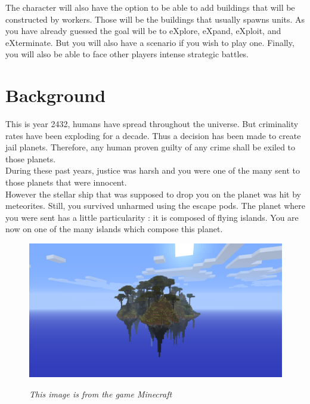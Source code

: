 \documentclass[article]{report} %
\begin{document}
								The character will also have the option to be able to add buildings that will be constructed by workers. Those will be the buildings that usually spawns units.\newline
								As you have already guessed the goal will be to eXplore, eXpand, eXploit, and eXterminate. But you will also have a scenario if you wish to play one.\newline
								Finally, you will also be able to face other players intense strategic battles.
						\section{Background} 
							This is year 2432, humans have spread throughout the universe. But criminality rates have been exploding for a decade. Thus a decision has been made to create jail planets. Therefore, any human proven guilty of any crime shall be exiled to those planets.\\
							
							During these past years, justice was harsh and you were one of the many sent to those planets that were innocent.\\

							However the stellar ship that was supposed to drop you on the planet was hit by meteorites. Still, you survived unharmed using the escape pods.  The planet where you were sent has a little particularity : it is composed of flying islands. You are now on one of the many islands which compose this planet.\\

							\begin{figure}[h]
								\includegraphics[width=16cm]{Images/FlyingIslands.png}
								\begin{center}\it This image is from the game Minecraft\end{center}
							\end{figure}
\end{document}
